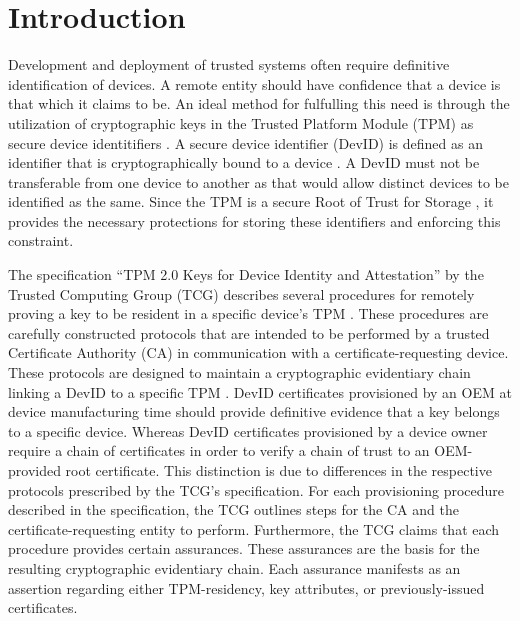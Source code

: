 \documentclass[runningheads]{llncs}
\begin{document}
\section{Introduction}
Development and deployment of trusted systems often require definitive identification of devices. A remote entity should have confidence that a device is that which it claims to be. An ideal method for fulfulling this need is through the utilization of cryptographic keys in the Trusted Platform Module (TPM) as secure device identitifiers \cite{DevIDSpec-TCG}. A secure device identifier (DevID) is defined as an identifier that is cryptographically bound to a device \cite{DevIDSpec-IEEE}. 
A DevID must not be transferable from one device to another as that would allow distinct devices to be identified as the same. 
Since the TPM is a secure Root of Trust for Storage \cite{TPMSpec}, it provides the necessary protections for storing these identifiers and enforcing this constraint. 

The specification ``TPM 2.0 Keys for Device Identity and Attestation'' by the Trusted Computing Group (TCG) describes several procedures for remotely proving a key to be resident in a specific device's TPM \cite{DevIDSpec-TCG}. These procedures are carefully constructed protocols that are intended to be performed by a trusted Certificate Authority (CA) in communication with a certificate-requesting device. These protocols are designed to maintain a cryptographic evidentiary chain linking a DevID to a specific TPM \cite{DevIDSpec-TCG}. 
DevID certificates provisioned by an OEM at device manufacturing time should provide definitive evidence that a key belongs to a specific device. Whereas DevID certificates provisioned by a device owner require a chain of certificates in order to verify a chain of trust to an OEM-provided root certificate. This distinction is due to differences in the respective protocols prescribed by the TCG's specification. 
For each provisioning procedure described in the specification, the TCG outlines steps for the CA and the certificate-requesting entity to perform. Furthermore, the TCG claims that each procedure provides certain assurances. These assurances are the basis for the resulting cryptographic evidentiary chain.
Each assurance manifests as an assertion regarding either TPM-residency, key attributes, or previously-issued certificates.
\end{document}
